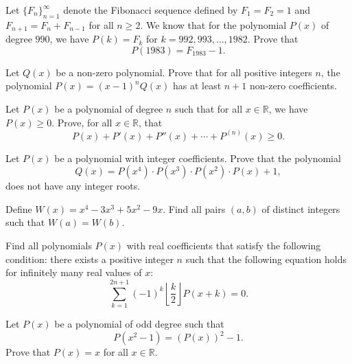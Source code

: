\begin{question}[name={1983 Romania}]
    Let $\{F_n\}_{n=1}^\infty$ denote the Fibonacci sequence defined by $F_1=F_2=1$ and $F_{n+1}=F_n + F_{n-1}$ for all $n\geq 2$. We know that for the polynomial $P(x)$ of degree $990$, we have $P(k)=F_k$ for $k=992,993,\dots,1982$. Prove that \[P(1983)=F_{1983}-1.\]
\end{question}

\begin{question}[name={1977 Bulgaria}]
    Let $Q(x)$ be a non-zero polynomial. Prove that for all positive integers $n$, the polynomial $P(x)=(x-1)^nQ(x)$ has at least $n+1$ non-zero coefficients.
\end{question}

\begin{question}[name={1985 Sweden}]
    Let $P(x)$ be a polynomial of degree $n$ such that for all $x\in\mathbb R$, we have $P(x) \geq 0$. Prove, for all $x\in \mathbb R$, that
    \[P(x) + P'(x) + P''(x) + \cdots + P^{(n)}(x) \geq 0.\]
\end{question}

\begin{question}[name={2000 Iran}]
    Let $P(x)$ be a polynomial with integer coefficients. Prove that the polynomial
    \[Q(x)=P(x^4)\cdot P(x^3) \cdot P(x^2) \cdot P(x) + 1,\]
    does not have any integer roots.
\end{question}


\begin{question}[name={2003 Poland}]
    Define $W(x)=x^4-3x^3+5x^2-9x$. Find all pairs $(a,b)$ of distinct integers such that $W(a)=W(b)$.
\end{question}


\begin{question}[name={2000 Austrian--Polish}]
    Find all polynomials $P(x)$ with real coefficients that satisfy the following condition: there exists a positive integer $n$ such that the following equation holds for infinitely many real values of $x$:
    \[\sum_{k=1}^{2n+1} (-1)^k \left\lfloor\frac{k}{2}\right\rfloor P(x+k) = 0.\] 
\end{question}



\begin{question}[name={2000 Poland}]
    Let $P(x)$ be a polynomial of odd degree such that
    \[P(x^2-1)=(P(x))^2 - 1.\]
    Prove that $P(x)=x$ for all $x\in\mathbb R$.
\end{question}



